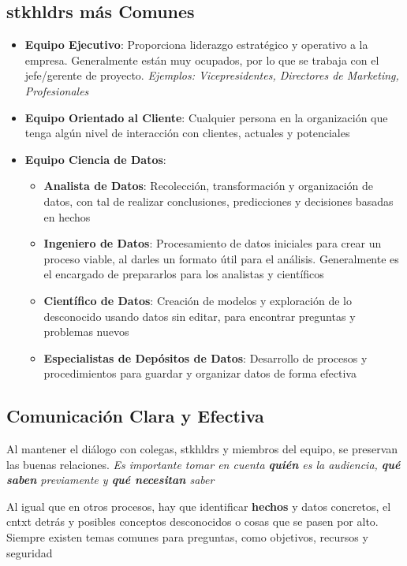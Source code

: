 \subsection{\gls{stkhldrs} más Comunes}
\begin{itemize}
    \item {\textbf{Equipo Ejecutivo}: Proporciona liderazgo estratégico y operativo a la empresa. Generalmente están muy ocupados, por lo que se trabaja con el jefe/gerente de proyecto. \textit{Ejemplos: Vicepresidentes, Directores de Marketing, Profesionales}}
    \item {\textbf{Equipo Orientado al Cliente}: Cualquier persona en la organización que tenga algún nivel de interacción con clientes, actuales y potenciales}
    \item {\textbf{Equipo Ciencia de Datos}: 
    \begin{itemize}
        \item {\textbf{Analista de Datos}: Recolección, transformación y organización de datos, con tal de realizar conclusiones, predicciones y decisiones basadas en hechos}
        \item {\textbf{Ingeniero de Datos}: Procesamiento de datos iniciales para crear un proceso viable, al darles un formato útil para el análisis. Generalmente es el encargado de prepararlos para los analistas y científicos}
        \item {\textbf{Científico de Datos}: Creación de modelos y exploración de lo desconocido usando datos sin editar, para encontrar preguntas y problemas nuevos}
        \item {\textbf{Especialistas de Depósitos de Datos}: Desarrollo de procesos y procedimientos para guardar y organizar datos de forma efectiva}
    \end{itemize}}
\end{itemize}

\subsection{Comunicación Clara y Efectiva}
Al mantener el diálogo con colegas, \gls{stkhldrs} y miembros del equipo, se preservan las buenas relaciones. \textit{Es importante tomar en cuenta \textbf{quién} es la audiencia, \textbf{qué saben} previamente y \textbf{qué necesitan} saber}

Al igual que en otros procesos, hay que identificar \textbf{hechos} y datos concretos, el \gls{cntxt} detrás y posibles conceptos desconocidos o cosas que se pasen por alto. Siempre existen temas comunes para preguntas, como objetivos, recursos y seguridad

